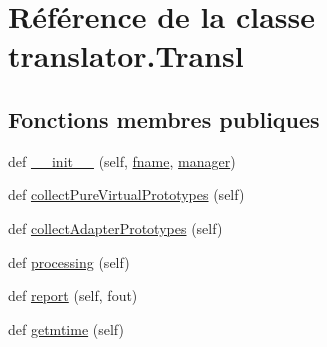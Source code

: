 \hypertarget{classtranslator_1_1_transl}{}\section{Référence de la classe translator.\+Transl}
\label{classtranslator_1_1_transl}
\subsection*{Fonctions membres publiques}
\begin{DoxyCompactItemize}
\item 
def \hyperlink{classtranslator_1_1_transl_a8c6390ddf78fb1f4e22fb46f6c585fe5}{\+\_\+\+\_\+init\+\_\+\+\_\+} (self, \hyperlink{classtranslator_1_1_transl_a44af94ad0291f2ebc64e0a2bada408a6}{fname}, \hyperlink{classtranslator_1_1_transl_a7a4978701f84657c594436e391b9d635}{manager})
\item 
def \hyperlink{classtranslator_1_1_transl_a9a11ebef292c720a8dada81e409df3bd}{collect\+Pure\+Virtual\+Prototypes} (self)
\item 
def \hyperlink{classtranslator_1_1_transl_a0aa3555a3d4ff434bd54af94c922159a}{collect\+Adapter\+Prototypes} (self)
\item 
def \hyperlink{classtranslator_1_1_transl_af3735bfc96ce58cc9c035d8091bac85b}{processing} (self)
\item 
def \hyperlink{classtranslator_1_1_transl_a70179583414dbb92f9875af3ae2ee5ba}{report} (self, fout)
\item 
def \hyperlink{classtranslator_1_1_transl_affb114b804b7bccb4ba4dd5b492009f7}{getmtime} (self)
\end{DoxyCompactItemize}
